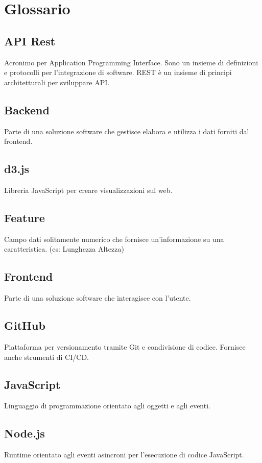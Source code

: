 \section{Glossario}
    \subsection{API Rest}
    Acronimo per Application Programming Interface. Sono un insieme di definizioni e protocolli
    per l’integrazione di software. REST è un insieme di principi architetturali per sviluppare API.

    \subsection{Backend}
    Parte di una soluzione software che gestisce elabora e utilizza i dati forniti dal frontend.

    \subsection{d3.js}
    Libreria JavaScript per creare visualizzazioni sul web.

    \subsection{Feature}
    Campo dati solitamente numerico che fornisce un’informazione su una caratteristica. (es: Lunghezza Altezza)

    \subsection{Frontend}
    Parte di una soluzione software che interagisce con l’utente.

    \subsection{GitHub}
    Piattaforma per versionamento tramite Git e condivisione di codice. Fornisce anche strumenti
    di CI/CD.

    \subsection{JavaScript}
    Linguaggio di programmazione orientato agli oggetti e agli eventi.

    \subsection{Node.js}
    Runtime orientato agli eventi asincroni per l’esecuzione di codice JavaScript.

